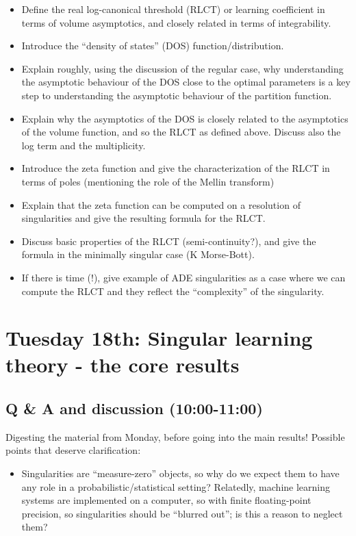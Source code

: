 \documentclass[a4paper,11pt]{amsart}
\begin{document}
\begin{itemize}  
\item Define the real log-canonical threshold (RLCT) or learning coefficient in terms of volume asymptotics, and closely related in terms of integrability.
\item Introduce the ``density of states'' (DOS) function/distribution.
\item Explain roughly, using the discussion of the regular case, why understanding the asymptotic behaviour of the DOS close to the optimal parameters is a key step to understanding the asymptotic behaviour of the partition function.
\item Explain why the asymptotics of the DOS is closely related to the asymptotics of the volume function, and so the RLCT as defined above. Discuss also the log term and the multiplicity.
\item Introduce the zeta function and give the characterization of the RLCT in terms of poles (mentioning the role of the Mellin transform)
\item Explain that the zeta function can be computed on a resolution of singularities and give the resulting formula for the RLCT.
\item Discuss basic properties of the RLCT (semi-continuity?), and give the formula in the minimally singular case (K Morse-Bott).
\item If there is time (!), give example of ADE singularities as a case where we can compute the RLCT and they reflect the ``complexity'' of the singularity.
\end{itemize}


\section*{Tuesday 18th: Singular learning theory - the core results}

\subsection*{Q \& A and discussion (10:00-11:00)}

Digesting the material from Monday, before going into the main results! Possible points that deserve clarification:
\begin{itemize}
\item Singularities are ``measure-zero'' objects, so why do we expect them to have any role in a probabilistic/statistical setting? Relatedly, machine learning systems are implemented on a computer, so with finite floating-point precision, so singularities should be ``blurred out''; is this a reason to neglect them?
\end{itemize}  
\end{document}
